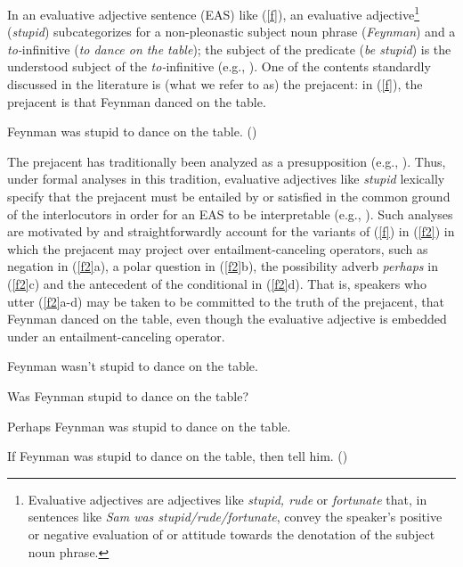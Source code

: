 \documentclass[11pt,fleqn]{article}
\newcommand{\6}{\mbox{$[\hspace*{-.6mm}[$}}
\newcommand{\9}{\mbox{$]\hspace*{-.6mm}]$}}
\begin{document}
In an evaluative adjective sentence (EAS) like (\ref{f}), an
evaluative adjective\footnote{Evaluative adjectives are adjectives like {\em stupid, rude} or {\em fortunate} that, in sentences like {\em Sam was stupid/rude/fortunate}, convey the speaker's positive or negative evaluation of or attitude towards the denotation of the subject noun phrase.} ({\em stupid}) subcategorizes for a non-pleonastic subject noun
phrase ({\em Feynman}) and a {\em to-}infinitive ({\em to
dance on the table}); the subject of the predicate ({\em be stupid}) is the understood subject of the {\em to-}infinitive (e.g., \citealt{wilkinson70, norrick78,barker02,kertz2010}).  One of the contents standardly discussed in the literature is (what we refer to as) the prejacent: in (\ref{f}), the prejacent is that Feynman danced on the table.

\begin{exe} 
\ex\label{f} Feynman was stupid to dance on the table. \hfill (\citealt[18]{barker02})
\end{exe} 
The prejacent has traditionally been analyzed as a presupposition (e.g., \citealt{norrick78,barker02,oshima09b,kertz2010}). Thus, under formal analyses in this tradition, evaluative adjectives like {\em stupid} lexically specify that the prejacent
must be entailed by or satisfied in the common ground of the interlocutors in
order for an EAS to be interpretable (e.g.,
\citealt{heim83,vds92}). Such analyses are motivated by and straightforwardly account for the variants of (\ref{f}) in (\ref{f2}) in which the prejacent may project over entailment-canceling operators, such as negation in (\ref{f2}a), a polar question in (\ref{f2}b), the possibility adverb {\em perhaps} in (\ref{f2}c) and the antecedent of the conditional in (\ref{f2}d). That is, speakers who utter (\ref{f2}a-d) may be taken to be committed to the truth of the prejacent, that Feynman danced on the table, even though the evaluative adjective is embedded under an entailment-canceling operator. 

\begin{exe}

\ex\label{f2} 

\begin{xlist}

\ex Feynman wasn't stupid to dance on the table.

\ex Was Feynman stupid to dance on the table?

\ex Perhaps Feynman was stupid to dance on the table.

\ex If Feynman was stupid to dance on the table, then tell him. \hfill (\citealt[18f.]{barker02})

\end{xlist}
\end{exe}
\end{document}
